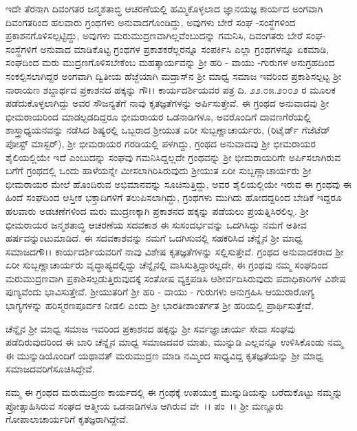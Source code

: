 ಇದೇ ತೆರನಾಗಿ ದಿವಂಗತರ ಜನ್ಮಶತಾಬ್ಧಿ ಆಚರಣೆಯಲ್ಲಿ ಹಮ್ಮಿಕೊಳ್ಳಲಾದ ಜ್ಞಾನಯಜ್ಞ ಕಾರ್ಯದ ಅಂಗವಾಗಿ ದಿವಂಗತರಿಂದ ಹಲವಾರು ಗ್ರಂಥಗಳು ಅನುವಾದಗೊಂಡಿದ್ದು, ಅವುಗಳು ಬೇರೆ ಸಂಘ -ಸಂಸ್ಥೆಗಳಿಂದ ಪ್ರಕಾಶನಗೊಳಿಸಲ್ಪಟ್ಟಿದ್ದು, ಅವುಗಳು ಮರುಮುದ್ರಣವಾಗಿಲ್ಲವೆಂಬುದನ್ನು ಗಮನಿಸಿ, ದಿವಂಗತರು ಬೇರೆ ಸಂಘ-ಸಂಸ್ಥೆಗಳಿಗೆ ಅನುವಾದ ಮಾಡಿಕೊಟ್ಟ ಗ್ರಂಥಗಳ ಪ್ರಕಾಶಕರೆಲ್ಲರನ್ನೂ ಸಂಪರ್ಕಿಸಿ ಎಲ್ಲಾ ಗ್ರಂಥಗಳನ್ನೂ ಏಕಮಾಡಿ, ಸಂಘದಿಂದ ಮರು ಮುದ್ರಣಗೊಳಿಸಬೇಕೆಂಬ ಮಹತ್ಕಾರ್ಯವನ್ನು ಶ‍್ರೀ ಹರಿ - ವಾಯು -\-ಗುರುಗಳ ಅನುಗ್ರಹದಿಂದ ಸಂಕಲ್ಪಿಸಲಾಗಿದ್ದರ ಅಂಗವಾಗಿ ದ್ವಿತೀಯ ಹೆಜ್ಜೆಯಾಗಿ ಮದ್ರಾಸ್‌ನ ಶ‍್ರೀ ಮಾಧ್ವ ಸಮಾಜ ಇವರಿಂದ ಪ್ರಕಾಶಿಸಲ್ಪಟ್ಟ ಶ‍್ರೀ ನಾರಾಯಣ ಶಬ್ದಾರ್ಥದ ಪ್ರಕಾಶನದ ಹಕ್ಕನ್ನು ಗೌ।। ಕಾರ್ಯದರ್ಶಿಯವರ ಪತ್ರ ದಿ. ೨೨.೦೫.೨೦೦೨ ರ ಮೂಲಕ ಪಡೆದುಕೊಳ್ಳಲಾಗಿದ್ದು ಅವರ ಸೌಜನ್ಯತೆಗೆ ನಾವು ಕೃತಜ್ಞತೆಗಳನ್ನು ಅರ್ಪಿಸುತ್ತೇವೆ. ಈ ಗ್ರಂಥದ ಅನುವಾದವು ಶ‍್ರೀ ಭೀಮರಾಯರಿಂದ ಮಾಡಲ್ಪಡದಿದ್ದರೂ ಭೀಮರಾಯರ ಒಡನಾಡಿಗಳೂ, ಅವರೊಂದಿಗೆ ದಾವಣಗೆರೆಯಲ್ಲಿ ಶಾಸ್ತ್ರಾಧ್ಯಯನವನ್ನು ನಡೆಸಿದ ಶಿಷ್ಯರಲ್ಲಿ ಒಬ್ಬರಾದ ಶ‍್ರೀಯುತ ಏರೀ ಸುಬ್ಬಣ್ಣಾಚಾರ್ಯರು, (ರಿಟೈರ್ಡ್ ಗೆಜೆಟೆಡ್ ಪೋಸ್ಟ್ ಮಾಸ್ಟರ್), ಶ‍್ರೀ ಭೀಮರಾಯರ ಗರಡಿಯಲ್ಲಿ ಪಳಗಿದ್ದು, ಗ್ರಂಥದ ಅನುವಾದವು ಶ‍್ರೀ ಭೀಮರಾಯರ ಶೈಲಿ\-ಯಲ್ಲಿಯೇ ಇದೆ ಎಂಬುದನ್ನು ಸಂಘವು ಗಮನಿಸಿದ್ದಲ್ಲದೇ ಗ್ರಂಥವನ್ನು ಶ‍್ರೀ ಭೀಮ\-ರಾಯರಿಗೇ ಅರ್ಪಿಸಲಾಗಿರುವ ಬಗೆಗೆ ಗ್ರಂಥದಲ್ಲಿ ಒಂದು ಹಾಳೆಯನ್ನೇ ಮೀಸಲಾಗಿರಿಸಿರುವುದು ಶ‍್ರೀಯುತ ಏರೀ ಸುಬ್ಬಣ್ಣಾಚಾರ್ಯರು ಶ‍್ರೀ ಭೀಮರಾಯರ ಮೇಲೆ ಹೊಂದಿರುವ ಅಭಿಮಾನವನ್ನು ಸೂಚಿಸುತ್ತಿದ್ದು, ಅವರ ಶೈಲಿಯಲ್ಲಿಯೇ ಇರುವ ಈ ಗ್ರಂಥವು ಈ ಹಿಂದೆ ಸಂಘದಿಂದ ಆಸ್ತೀಕ ಭಕ್ತಾದಿಗಳಿಗೆ ತಲುಪಿಸಲಾಗಿದ್ದು, ಗ್ರಂಥಗಳು ಮುಗಿದು ಹೋದದ್ದ\-ರಿಂದ ಬೇಡಿಕೆ ಇದ್ದರೂ ಹಲವಾರು ಅಡಚಣೆಗಳಿಂದ ಮರು ಮುದ್ರಣಕ್ಕಾಗಿ ಪ್ರಕಾಶನದ ಹಕ್ಕನ್ನು ಪಡೆಯಲು ಪ್ರಯತ್ನಿಸಿರಲಿಲ್ಲ. ಶ‍್ರೀ ಭೀಮರಾಯರ ಜನ್ಮಶತಾಬ್ಧಿ ಆಚರಣೆಯ ಸದವಕಾಶ ಈ ಸುಸಂದರ್ಭವನ್ನು ಒದಗಿಸಿದ್ದು ನಮಗೆ ಅತೀವ ಹರ್ಷವನ್ನುಂಟುಮಾಡಿದೆ. ಈ ಸದವಕಾಶವನ್ನು ನಮಗೆ ಒದಗಿಸುವಲ್ಲಿ ಸಹಕರಿಸಿದ ಚೆನ್ನೈನ ಶ‍್ರೀ ಮಾಧ್ವ ಸಮಾಜದ\break ಗೌ।। ಕಾರ್ಯದರ್ಶಿ\-ಯವರಿಗೆ ನಾವು ವಿಶೇಷ ಕೃತಜ್ಞತೆಗಳನ್ನು ಸಲ್ಲಿಸುತ್ತೇವೆ. ಗ್ರಂಥದ ಅನುವಾದಕರಾದ ಶ‍್ರೀ ಏರೀ ಸುಬ್ಬಣ್ಣಾಚಾರ್ಯರು ವೃದ್ಧಾಪ್ಯದಲ್ಲಿದ್ದು ಚೆನ್ನೈನಲ್ಲಿ ವಾಸಿಸುತ್ತಿದ್ದಾರಲ್ಲದೇ, ಈ ಗ್ರಂಥವು ನಮ್ಮ ಸಂಘದಿಂದ ಮರುಮುದ್ರಣವಾಗಿ ಪ್ರಕಾಶಿಸಲ್ಪಡುತ್ತಿರುವುದಕ್ಕೆ ಸಂತೋಷ ವ್ಯಕ್ತಪಡಿಸಿ ಆಶೀರ್ವದಿಸಿರುವುದು ಪದಾಧಿಕಾರಿಗಳ ವಿಶೇಷ ಪುಣ್ಯ\-ವೆಂದು ಭಾವಿಸು\-ತ್ತೇವೆ. ಶ‍್ರೀಯುತರಿಗೆ ಶ‍್ರೀ ಹರಿ - ವಾಯು - ಗುರುಗಳು ಅನುಗ್ರಹಿಸಿ ಆಯುರಾ\-ರೋಗ್ಯ ಭಾಗ್ಯಗಳನ್ನು ಹರಿಸ್ಮರಣಪೂರ್ವಕ ನೀಡಲಿ ಎಂದು ಶ‍್ರೀ ಭಾರತೀ\-ಶಾಂತರ್ಗತ ಶ‍್ರೀ ಹರಿಯಲ್ಲಿ ಪ್ರಾರ್ಥಿಸುತ್ತೇವೆ.

ಚೆನ್ನೈನ ಶ‍್ರೀ ಮಾಧ್ವ ಸಮಾಜ ಇವರಿಂದ ಪ್ರಕಾಶನದ ಹಕ್ಕನ್ನು ಶ‍್ರೀ ಸರ್ವಜ್ಞಾಚಾರ್ಯ ಸೇವಾ ಸಂಘವು ಪಡೆದಿರುವುದರಿಂದ ಈ ಬಾರಿ ಚೆನ್ನೈನ ಮಾಧ್ವ ಸಮಾಜದವರ ಮಾತು, ಮುನ್ನುಡಿ ಎಲ್ಲವನ್ನೂ ಉಳಿಸಿಕೊಂಡು ನಮ್ಮ ಈ ಮುನ್ನುಡಿಯೊಂದಿಗೆ ಯಥಾವತ್ ಮರುಮುದ್ರಣ ಮಾಡಿ ನಮ್ಮಿಂದ ಸಾಧ್ಯವಿದ್ದ ಕೃತಜ್ಞತೆಯನ್ನು ಶ‍್ರೀ ಮಾಧ್ವ ಸಮಾಜದವರಿಗೆ\break ಸೂಚಿಸಿದ್ದೇವೆ.

ನಮ್ಮ ಈ ಗ್ರಂಥದ ಮರುಮುದ್ರಣ ಕಾರ್ಯದಲ್ಲಿ ಈ ಗ್ರಂಥಕ್ಕೆ ಉಪಯುಕ್ತ ಮುನ್ನುಡಿಯನ್ನು ಬರೆದುಕೊಟ್ಟು ನಮ್ಮನ್ನು ಪ್ರೋತ್ಸಾಹಿಸಿರುವ ಸಂಘದ ಆತ್ಮೀಯ ಒಡನಾಡಿಗಳೂ ಆಗಿರುವ ವೇ~।। ಪಂ~।। ಶ‍್ರೀ ಮಣ್ಣೂರು ಗೋಪಾಲಾಚಾರ್ಯರಿಗೆ ಕೃತಜ್ಞರಾಗಿದ್ದೇವೆ.

